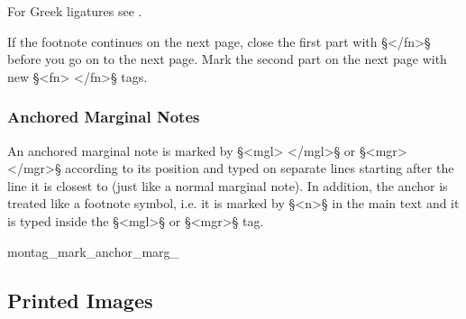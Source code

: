 \begin{crossref}
For Greek ligatures see .
\end{crossref}

\begin{note}
If the footnote continues on the next page, close the first part with §</fn>§ before you go on to the next page. Mark the second part on the next page with new §<fn> </fn>§ tags.
\end{note}


\subsubsection{Anchored Marginal Notes}
\label{section anchored marginal notes}

\begin{mainruleLessImportant}
An anchored marginal note is marked by §<mgl> </mgl>§ or §<mgr> </mgr>§ according to its position and typed on separate lines starting after the line it is closest to (just like a normal marginal note). In addition, the anchor is treated like a footnote symbol, i.e. it is marked by §<n>§ in the main text and it is typed inside the §<mgl>§ or §<mgr>§ tag.
\end{mainruleLessImportant}

\begin{sampleImage}{montag_mark_anchor_marg_} %
\end{sampleImage}



\label{section anchored comments}




\tocspace
\subsection{Printed Images}

